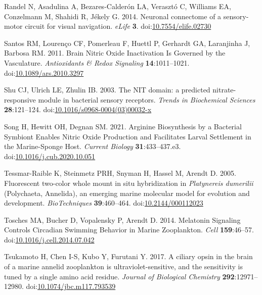 \documentclass[
  10pt,
  onecolumn]{article}
\newlength{\cslhangindent}
\newlength{\cslentryspacingunit} %
\newenvironment{CSLReferences}[2] %
 {%
  \setlength{\parindent}{0pt}
  \ifodd #1
  \let\oldpar\par
  \def\par{\hangindent=\cslhangindent\oldpar}
  \fi
  \setlength{\parskip}{#2\cslentryspacingunit}
 }%
 {}
\begin{document}
\begin{CSLReferences}{1}{0}
\leavevmode{}%
Randel N, Asadulina A, Bezares-Calderón LA, Verasztó C, Williams EA,
Conzelmann M, Shahidi R, Jékely G. 2014. Neuronal connectome of a
sensory-motor circuit for visual navigation. \emph{eLife} \textbf{3}.
doi:\href{https://doi.org/10.7554/elife.02730}{10.7554/elife.02730}

\leavevmode{}%
Santos RM, Lourenço CF, Pomerleau F, Huettl P, Gerhardt GA, Laranjinha
J, Barbosa RM. 2011. Brain Nitric Oxide Inactivation Is Governed by the
Vasculature. \emph{Antioxidants \& Redox Signaling}
\textbf{14}:1011--1021.
doi:\href{https://doi.org/10.1089/ars.2010.3297}{10.1089/ars.2010.3297}

\leavevmode{}%
Shu CJ, Ulrich LE, Zhulin IB. 2003. The NIT domain: a predicted
nitrate-responsive module in bacterial sensory receptors. \emph{Trends
in Biochemical Sciences} \textbf{28}:121--124.
doi:\href{https://doi.org/10.1016/s0968-0004(03)00032-x}{10.1016/s0968-0004(03)00032-x}

\leavevmode{}%
Song H, Hewitt OH, Degnan SM. 2021. Arginine Biosynthesis by a Bacterial
Symbiont Enables Nitric Oxide Production and Facilitates Larval
Settlement in the Marine-Sponge Host. \emph{Current Biology}
\textbf{31}:433--437.e3.
doi:\href{https://doi.org/10.1016/j.cub.2020.10.051}{10.1016/j.cub.2020.10.051}

\leavevmode{}%
Tessmar-Raible K, Steinmetz PRH, Snyman H, Hassel M, Arendt D. 2005.
Fluorescent two-color whole mount in situ hybridization in
{\emph{Platynereis dumerilii}} (Polychaeta, Annelida), an emerging
marine molecular model for evolution and development.
\emph{BioTechniques} \textbf{39}:460--464.
doi:\href{https://doi.org/10.2144/000112023}{10.2144/000112023}

\leavevmode{}%
Tosches MA, Bucher D, Vopalensky P, Arendt D. 2014. Melatonin Signaling
Controls Circadian Swimming Behavior in Marine Zooplankton. \emph{Cell}
\textbf{159}:46--57.
doi:\href{https://doi.org/10.1016/j.cell.2014.07.042}{10.1016/j.cell.2014.07.042}

\leavevmode{}%
Tsukamoto H, Chen I-S, Kubo Y, Furutani Y. 2017. A ciliary opsin in the
brain of a marine annelid zooplankton is ultraviolet-sensitive, and the
sensitivity is tuned by a single amino acid residue. \emph{Journal of
Biological Chemistry} \textbf{292}:12971--12980.
doi:\href{https://doi.org/10.1074/jbc.m117.793539}{10.1074/jbc.m117.793539}


\end{CSLReferences}
\end{document}

